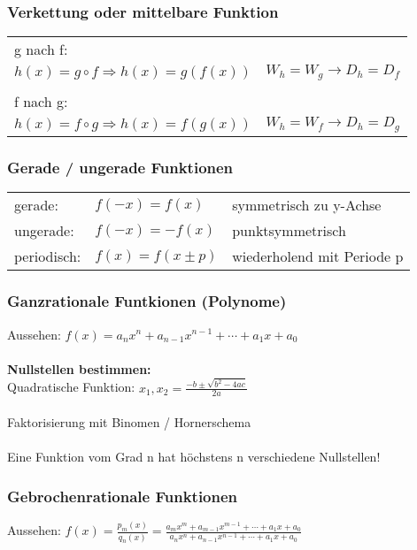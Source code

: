 \subsubsection{Verkettung oder mittelbare Funktion}
    \begin{tabular}{ll} %
        g nach f: & \\
        $h(x)=g \circ f \Rightarrow h(x)=g(f(x))$ & $W_h=W_g \rightarrow D_h=D_f$ \\
        \\
        f nach g: \\
        $h(x)=f \circ g \Rightarrow h(x)=f(g(x))$ & $W_h=W_f \rightarrow D_h=D_g$ \\				
    \end{tabular}
    
\subsubsection{Gerade / ungerade Funktionen}
    \begin{tabular}{lll} 
         gerade:     & $f(-x) = f(x)$      & symmetrisch zu y-Achse \\
         ungerade:   & $f(-x) = -f(x)$     & punktsymmetrisch \\
         periodisch: & $f(x) = f(x \pm p)$ & wiederholend mit Periode p \\								
    \end{tabular}			
        
\subsubsection{Ganzrationale Funtkionen (Polynome)}
    Aussehen: $f(x)=a_nx^{n}+a_{n-1}x^{n-1}+\cdots+a_1x+a_0$\\
    \\
    \textbf{Nullstellen bestimmen:} \\
    Quadratische Funktion: $x_1 , x_2 = \frac{-b \pm \sqrt{b^2 - 4ac}}{2a}$ \\
    \\
    Faktorisierung mit Binomen / Hornerschema \\
    \\
    Eine Funktion vom Grad n hat höchstens n verschiedene Nullstellen!
    
\subsubsection{Gebrochenrationale Funktionen}
    Aussehen: $f(x)=\frac{p_m(x)}{q_n(x)}=\frac{a_mx^{m}+a_{m-1}x^{m-1}+\cdots+a_1x+a_0}{a_nx^{n}+a_{n-1}x^{n-1}+\cdots+a_1x+a_0}$ \\
    
